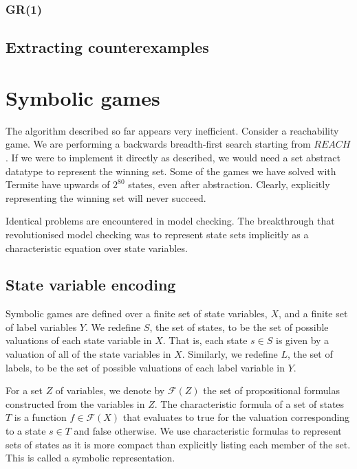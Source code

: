 \documentclass[a4paper,twoside,openright,11pt]{book}
\newcommand{\forms}[0]{\mathcal{F}}
\theoremstyle{definition}
\begin{document}
\subsubsection{GR(1)}

\subsection{Extracting counterexamples}

\section{Symbolic games}

The algorithm described so far appears very inefficient. Consider a reachability game. We are performing a backwards breadth-first search starting from $REACH$. If we were to implement it directly as described, we would need a set abstract datatype to represent the winning set. Some of the games we have solved with Termite have upwards of $2^{80}$ states, even after abstraction. Clearly, explicitly representing the winning set will never succeed. 

Identical problems are encountered in model checking. The breakthrough that revolutionised model checking was to represent state sets implicitly as a characteristic equation over state variables.

\subsection{State variable encoding}

Symbolic games are defined over a finite set of state variables, $X$, and a finite set of label variables $Y$. We redefine $S$, the set of states, to be the set of possible valuations of each state variable in $X$. That is, each state $s \in S$ is given by a valuation of all of the state variables in $X$. Similarly, we redefine $L$, the set of labels, to be the set of possible valuations of each label variable in $Y$.

For a set $Z$ of variables, we denote by $\forms(Z)$ the set of propositional formulas constructed from the variables in $Z$. The characteristic formula of a set of states $T$ is a function $f \in \forms(X)$ that evaluates to true for the valuation corresponding to a state $s \in T$ and false otherwise. We use characteristic formulas to represent sets of states as it is more compact than explicitly listing each member of the set. This is called a symbolic representation.
\end{document}
